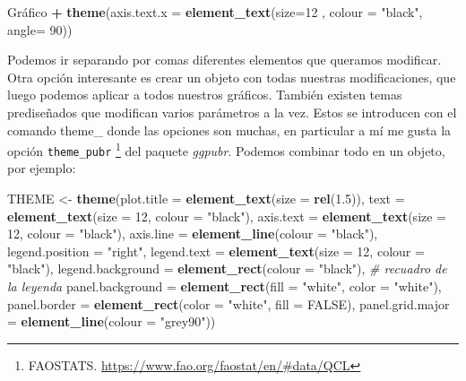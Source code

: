 \documentclass[
]{article}
\newenvironment{Shaded}{\begin{snugshade}}{\end{snugshade}}
\newcommand{\AttributeTok}[1]{\textcolor[rgb]{0.13,0.29,0.53}{#1}}
\newcommand{\CommentTok}[1]{\textcolor[rgb]{0.56,0.35,0.01}{\textit{#1}}}
\newcommand{\ConstantTok}[1]{\textcolor[rgb]{0.56,0.35,0.01}{#1}}
\newcommand{\DecValTok}[1]{\textcolor[rgb]{0.00,0.00,0.81}{#1}}
\newcommand{\FloatTok}[1]{\textcolor[rgb]{0.00,0.00,0.81}{#1}}
\newcommand{\FunctionTok}[1]{\textcolor[rgb]{0.13,0.29,0.53}{\textbf{#1}}}
\newcommand{\NormalTok}[1]{#1}
\newcommand{\OtherTok}[1]{\textcolor[rgb]{0.56,0.35,0.01}{#1}}
\newcommand{\SpecialCharTok}[1]{\textcolor[rgb]{0.81,0.36,0.00}{\textbf{#1}}}
\newcommand{\StringTok}[1]{\textcolor[rgb]{0.31,0.60,0.02}{#1}}
\begin{document}
\begin{Shaded}
\begin{Highlighting}[]
\NormalTok{Gráfico }\SpecialCharTok{+}
  \FunctionTok{theme}\NormalTok{(}\AttributeTok{axis.text.x =} \FunctionTok{element\_text}\NormalTok{(}\AttributeTok{size=}\DecValTok{12}\NormalTok{ ,}
                                   \AttributeTok{colour =} \StringTok{"black"}\NormalTok{,}
                                   \AttributeTok{angle=} \DecValTok{90}\NormalTok{))}
\end{Highlighting}
\end{Shaded}

Podemos ir separando por comas diferentes elementos que queramos
modificar. Otra opción interesante es crear un objeto con todas nuestras
modificaciones, que luego podemos aplicar a todos nuestros gráficos.
También existen temas prediseñados que modifican varios parámetros a la
vez. Estos se introducen con el comando theme\_ donde las opciones son
muchas, en particular a mí me gusta la opción \texttt{theme\_pubr}
\footnote{FAOSTATS. \url{https://www.fao.org/faostat/en/\#data/QCL}} del
paquete \emph{ggpubr}. Podemos combinar todo en un objeto, por ejemplo:

\begin{Shaded}
\begin{Highlighting}[]
\NormalTok{THEME }\OtherTok{\textless{}{-}} \FunctionTok{theme}\NormalTok{(}\AttributeTok{plot.title =} \FunctionTok{element\_text}\NormalTok{(}\AttributeTok{size =} \FunctionTok{rel}\NormalTok{(}\FloatTok{1.5}\NormalTok{)),}
               \AttributeTok{text =} \FunctionTok{element\_text}\NormalTok{(}\AttributeTok{size =} \DecValTok{12}\NormalTok{, }\AttributeTok{colour =} \StringTok{"black"}\NormalTok{),}
               \AttributeTok{axis.text =} \FunctionTok{element\_text}\NormalTok{(}\AttributeTok{size =} \DecValTok{12}\NormalTok{, }\AttributeTok{colour =} \StringTok{"black"}\NormalTok{),}
               \AttributeTok{axis.line =} \FunctionTok{element\_line}\NormalTok{(}\AttributeTok{colour =} \StringTok{"black"}\NormalTok{),}
               \AttributeTok{legend.position =} \StringTok{"right"}\NormalTok{,}
               \AttributeTok{legend.text =} \FunctionTok{element\_text}\NormalTok{(}\AttributeTok{size =} \DecValTok{12}\NormalTok{, }\AttributeTok{colour =} \StringTok{"black"}\NormalTok{),}
               \AttributeTok{legend.background =} \FunctionTok{element\_rect}\NormalTok{(}\AttributeTok{colour =} \StringTok{"black"}\NormalTok{),  }\CommentTok{\# recuadro de la leyenda}
               \AttributeTok{panel.background =} \FunctionTok{element\_rect}\NormalTok{(}\AttributeTok{fill =} \StringTok{"white"}\NormalTok{, }
                                               \AttributeTok{color =} \StringTok{"white"}\NormalTok{),}
               \AttributeTok{panel.border =} \FunctionTok{element\_rect}\NormalTok{(}\AttributeTok{color =} \StringTok{"white"}\NormalTok{, }
                                           \AttributeTok{fill =} \ConstantTok{FALSE}\NormalTok{),}
               \AttributeTok{panel.grid.major =} \FunctionTok{element\_line}\NormalTok{(}\AttributeTok{colour =} \StringTok{"grey90"}\NormalTok{))}
\end{Highlighting}
\end{Shaded}
\end{document}
